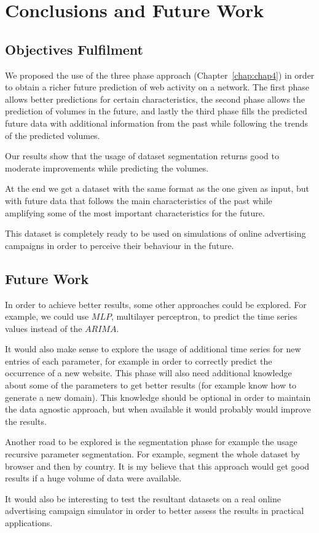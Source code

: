 \chapter{Conclusions and Future Work} \label{chap:concl}

\section*{}

\section{Objectives Fulfilment}

We proposed the use of the three phase approach (Chapter~\ref{chap:chap4}) in
order to obtain a richer future prediction of web activity on a network.
The first phase allows better predictions for certain characteristics,
the second phase allows the prediction of volumes in the future, and lastly the third
phase fills the predicted future data with additional information from the past
while following
the trends of the predicted volumes.

Our results show that the usage of dataset segmentation returns good to moderate
improvements while predicting the volumes.

At the end we get a dataset with the same format as the one given as input, but with future
data that follows the main characteristics of the past while amplifying some of the
most important characteristics for the future.

This dataset is completely ready to be used on simulations of online advertising
campaigns in order to perceive their behaviour in the future.

\section{Future Work}

In order to achieve better results, some other approaches could be explored. For
example, we could use $MLP$, multilayer perceptron, to predict the time series values
instead of the $ARIMA$.

It would also make sense to explore the usage of additional time series for new
entries of each parameter, for example in order to correctly predict the occurrence of a new
website. This phase will also need additional knowledge about
some of the parameters to get better results (for example know how to generate a
new domain). This knowledge should be optional in order to maintain the data
agnostic approach, but when available it would probably would improve the results.

Another road to be explored is the segmentation phase for example the usage
recursive parameter segmentation. For example, segment the whole dataset by
browser and then by country. It is my believe that this approach would get good
results if a huge volume of data were available.

It would also be interesting to test the resultant datasets on a real online
advertising campaign simulator in order to better assess the results in practical
applications.

